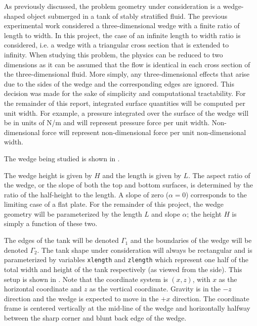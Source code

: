 \documentclass[12pt]{article}
\begin{document}
As previously discussed, the problem geometry under consideration is a wedge-shaped object submerged in a tank of stably stratified fluid.  The previous experimental work considered a three-dimensional wedge with a finite ratio of length to width. In this project, the case of an infinite length to width ratio is considered, i.e. a wedge with a triangular cross section that is extended to infinity. When studying this problem, the physics can be reduced to two dimensions as it can be assumed that the flow is identical in each cross section of the three-dimensional fluid. More simply, any three-dimensional effects that arise due to the sides of the wedge and the corresponding edges are ignored. This decision was made for the sake of simplicity and computational tractability. For the remainder of this report, integrated surface quantities will be computed per unit width. For example, a pressure integrated over the surface of the wedge will be in units of N/m and will represent pressure force per unit width. Non-dimensional force will represent non-dimensional force per unit non-dimensional width.

The wedge being studied is shown in .


The wedge height is given by $H$ and the length is given by $L$. The aspect ratio of the wedge, or the slope of both the top and bottom surfaces, is determined by the ratio of the half-height to the length. A slope of zero ($\alpha =0$) corresponds to the limiting case of a flat plate. For the remainder of this project, the wedge geometry will be parameterized by the length $L$ and slope $\alpha$; the height $H$ is simply a function of these two.

The edges of the tank will be denoted $\Gamma_1$ and the boundaries of the wedge will be denoted $\Gamma_2$. The tank shape under consideration will always be rectangular and is parameterized by variables \texttt{xlength} and \texttt{zlength} which represent one half of the total width and height of the tank respectively (as viewed from the side). This setup is shown in . Note that the coordinate system is $(x,z)$, with $x$ as the horizontal coordinate and $z$ as the vertical coordinate. Gravity is in the $-z$ direction and the wedge is expected to move in the $+x$ direction. The coordinate frame is centered vertically at the mid-line of the wedge and horizontally halfway between the sharp corner and blunt back edge of the wedge.
\end{document}
